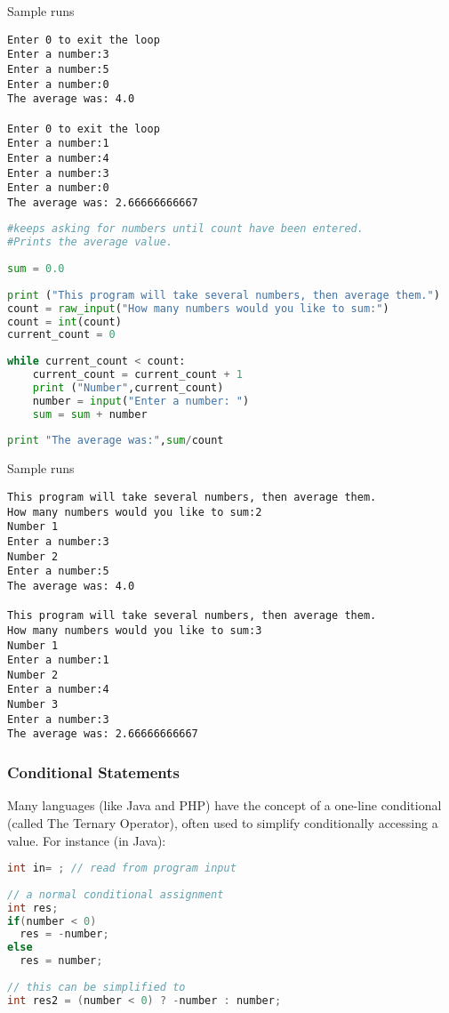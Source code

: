 Sample runs
\scriptsize
\begin{verbatim}
Enter 0 to exit the loop
Enter a number:3
Enter a number:5
Enter a number:0
The average was: 4.0

Enter 0 to exit the loop
Enter a number:1
Enter a number:4
Enter a number:3
Enter a number:0
The average was: 2.66666666667
\end{verbatim}
\normalsize
\lstset{basicstyle=\scriptsize, numbers=left, captionpos=b, tabsize=4}
\begin{lstlisting}[caption=average2.py,language={Python},
xleftmargin=15pt, label=lst:average2]
#keeps asking for numbers until count have been entered.
#Prints the average value.
 
sum = 0.0
 
print ("This program will take several numbers, then average them.")
count = raw_input("How many numbers would you like to sum:")
count = int(count)
current_count = 0
 
while current_count < count:
    current_count = current_count + 1
    print ("Number",current_count)
    number = input("Enter a number: ")
    sum = sum + number
 
print "The average was:",sum/count
\end{lstlisting}
Sample runs
\scriptsize
\begin{verbatim}
This program will take several numbers, then average them.
How many numbers would you like to sum:2
Number 1
Enter a number:3
Number 2
Enter a number:5
The average was: 4.0

This program will take several numbers, then average them.
How many numbers would you like to sum:3
Number 1
Enter a number:1
Number 2
Enter a number:4
Number 3
Enter a number:3
The average was: 2.66666666667
\end{verbatim}
\normalsize

\subsubsection{Conditional Statements}
Many languages (like Java and PHP) have the concept of a one-line conditional
(called The Ternary Operator), often used to simplify conditionally accessing a
value. For instance (in Java):
\lstset{basicstyle=\scriptsize, numbers=left, captionpos=b, tabsize=4}
\begin{lstlisting}[caption=Ternary Operator Java,language={Java},
xleftmargin=15pt, label=lst:ternaryoperatorjava]
int in= ; // read from program input
 
// a normal conditional assignment
int res;
if(number < 0)
  res = -number;
else
  res = number;
 
// this can be simplified to
int res2 = (number < 0) ? -number : number;
\end{lstlisting}

